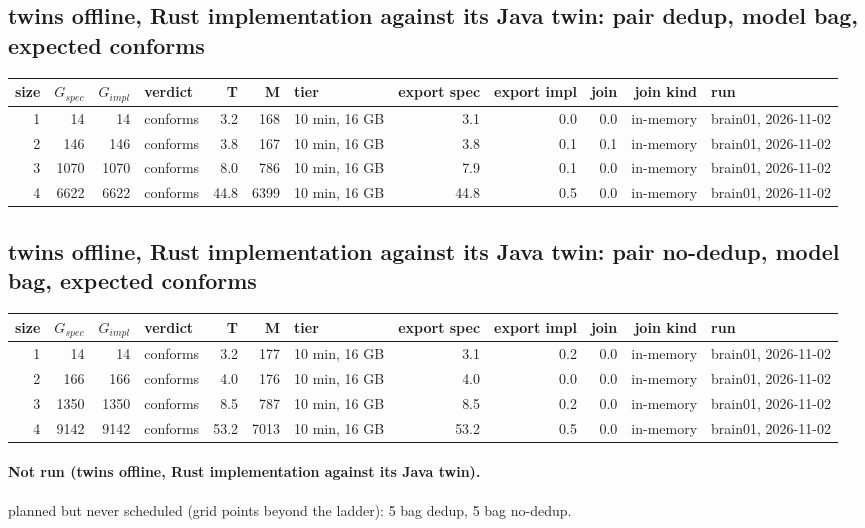 \documentclass[10pt]{article}
\begin{document}
\subsection*{twins offline, Rust implementation against its Java twin: pair \textsf{dedup}, model bag, expected conforms}
\begin{longtable}{@{}rrrlrrlrrrrl@{}}
\toprule
size & $G_{\mathit{spec}}$ & $G_{\mathit{impl}}$ & verdict & T & M & tier & export spec & export impl & join & join kind & run \\
\midrule
\endhead
\color{red} 1 & 14 & 14 & conforms & 3.2 & 168 & 10 min, 16 GB & 3.1 & 0.0 & 0.0 & in-memory & brain01, 2026-11-02 \\
\color{red} 2 & 146 & 146 & conforms & 3.8 & 167 & 10 min, 16 GB & 3.8 & 0.1 & 0.1 & in-memory & brain01, 2026-11-02 \\
\color{red} 3 & 1070 & 1070 & conforms & 8.0 & 786 & 10 min, 16 GB & 7.9 & 0.1 & 0.0 & in-memory & brain01, 2026-11-02 \\
\color{red} 4 & 6622 & 6622 & conforms & 44.8 & 6399 & 10 min, 16 GB & 44.8 & 0.5 & 0.0 & in-memory & brain01, 2026-11-02 \\
\bottomrule
\end{longtable}
\subsection*{twins offline, Rust implementation against its Java twin: pair \textsf{no-dedup}, model bag, expected conforms}
\begin{longtable}{@{}rrrlrrlrrrrl@{}}
\toprule
size & $G_{\mathit{spec}}$ & $G_{\mathit{impl}}$ & verdict & T & M & tier & export spec & export impl & join & join kind & run \\
\midrule
\endhead
\color{red} 1 & 14 & 14 & conforms & 3.2 & 177 & 10 min, 16 GB & 3.1 & 0.2 & 0.0 & in-memory & brain01, 2026-11-02 \\
\color{red} 2 & 166 & 166 & conforms & 4.0 & 176 & 10 min, 16 GB & 4.0 & 0.0 & 0.0 & in-memory & brain01, 2026-11-02 \\
\color{red} 3 & 1350 & 1350 & conforms & 8.5 & 787 & 10 min, 16 GB & 8.5 & 0.2 & 0.0 & in-memory & brain01, 2026-11-02 \\
\color{red} 4 & 9142 & 9142 & conforms & 53.2 & 7013 & 10 min, 16 GB & 53.2 & 0.5 & 0.0 & in-memory & brain01, 2026-11-02 \\
\bottomrule
\end{longtable}
\paragraph{Not run (twins offline, Rust implementation against its Java twin).}
planned but never scheduled (grid points beyond the ladder): 5 bag dedup, 5 bag no-dedup.\par
\end{document}
